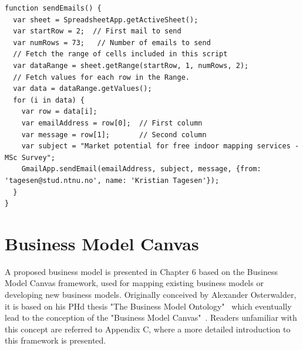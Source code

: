 
\lstset{
   language=JavaScript,
   extendedchars=true,
   basicstyle=\footnotesize\ttfamily,
   showstringspaces=false,
   showspaces=false,
   numbers=left,
   numberstyle=\footnotesize,
   numbersep=9pt,
   tabsize=2,
   breaklines=true,
   showtabs=false,
   captionpos=b
}

\medskip
\begin{lstlisting}[caption=Email Sendout Script,label={lst:email}]
function sendEmails() {
  var sheet = SpreadsheetApp.getActiveSheet();
  var startRow = 2;  // First mail to send
  var numRows = 73;   // Number of emails to send
  // Fetch the range of cells included in this script
  var dataRange = sheet.getRange(startRow, 1, numRows, 2);
  // Fetch values for each row in the Range.
  var data = dataRange.getValues();
  for (i in data) {
    var row = data[i];
    var emailAddress = row[0];  // First column
    var message = row[1];       // Second column
    var subject = "Market potential for free indoor mapping services - MSc Survey";
    GmailApp.sendEmail(emailAddress, subject, message, {from: 'tagesen@stud.ntnu.no', name: 'Kristian Tagesen'});
  }
}
\end{lstlisting}

\section{Business Model Canvas}
A proposed business model is presented in Chapter 6 based on the Business Model Canvas framework, used for mapping existing business models or developing new business models. Originally conceived by Alexander Osterwalder, it is based on his PHd thesis "The Business Model Ontology"~\cite{alexanderosterwalder2004} which eventually lead to the conception of the "Business Model Canvas"~\cite{billmartin2008}. Readers unfamiliar with this concept are referred to Appendix C, where a more detailed introduction to this framework is presented. 